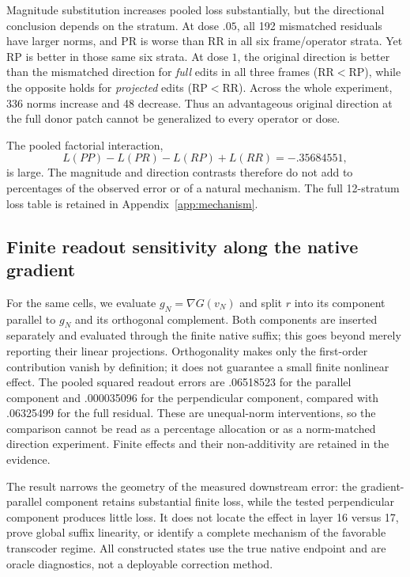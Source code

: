 Magnitude substitution increases pooled loss substantially, but the directional conclusion depends on the stratum. At dose $.05$, all 192 mismatched residuals have larger norms, and PR is worse than RR in all six frame/operator strata. Yet RP is better in those same six strata. At dose $1$, the original direction is better than the mismatched direction for \emph{full} edits in all three frames (RR$<$RP), while the opposite holds for \emph{projected} edits (RP$<$RR). Across the whole experiment, 336 norms increase and 48 decrease. Thus an advantageous original direction at the full donor patch cannot be generalized to every operator or dose.

The pooled factorial interaction,
\[
 L(PP)-L(PR)-L(RP)+L(RR)=-.35684551,
\]
is large. The magnitude and direction contrasts therefore do not add to percentages of the observed error or of a natural mechanism. The full 12-stratum loss table is retained in Appendix~\ref{app:mechanism}.

\subsection{Finite readout sensitivity along the native gradient}
For the same cells, we evaluate $g_N=\nabla G(v_N)$ and split $r$ into its component parallel to $g_N$ and its orthogonal complement. Both components are inserted separately and evaluated through the finite native suffix; this goes beyond merely reporting their linear projections. Orthogonality makes only the first-order contribution vanish by definition; it does not guarantee a small finite nonlinear effect. The pooled squared readout errors are .06518523 for the parallel component and .000035096 for the perpendicular component, compared with .06325499 for the full residual. These are unequal-norm interventions, so the comparison cannot be read as a percentage allocation or as a norm-matched direction experiment. Finite effects and their non-additivity are retained in the evidence.

The result narrows the geometry of the measured downstream error: the gradient-parallel component retains substantial finite loss, while the tested perpendicular component produces little loss. It does not locate the effect in layer 16 versus 17, prove global suffix linearity, or identify a complete mechanism of the favorable transcoder regime. All constructed states use the true native endpoint and are oracle diagnostics, not a deployable correction method.
